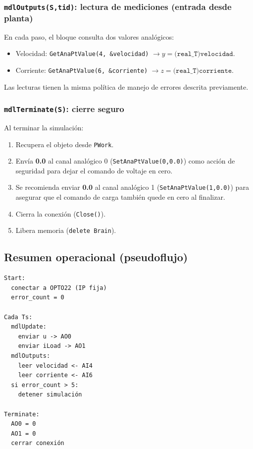 \subsubsection{\texttt{mdlOutputs(S,tid)}: lectura de mediciones (entrada desde planta)}
En cada paso, el bloque consulta dos valores analógicos:
\begin{itemize}
    \item Velocidad: \texttt{GetAnaPtValue(4, \&velocidad)} $\rightarrow y = \texttt{(real\_T)velocidad}$.
    \item Corriente: \texttt{GetAnaPtValue(6, \&corriente)} $\rightarrow z = \texttt{(real\_T)corriente}$.
\end{itemize}
Las lecturas tienen la misma política de manejo de errores descrita previamente.

\subsubsection{\texttt{mdlTerminate(S)}: cierre seguro}
Al terminar la simulación:
\begin{enumerate}
    \item Recupera el objeto desde \texttt{PWork}.
    \item Envía \textbf{0.0} al canal analógico 0 (\texttt{SetAnaPtValue(0,0.0)}) como acción de seguridad para dejar el comando de voltaje en cero.
    \item Se recomienda enviar \textbf{0.0} al canal analógico 1 (\texttt{SetAnaPtValue(1,0.0)}) para asegurar que el comando de carga también quede en cero al finalizar.
    \item Cierra la conexión (\texttt{Close()}).
    \item Libera memoria (\texttt{delete Brain}).
\end{enumerate}

\subsection{Resumen operacional (pseudoflujo)}
\begin{verbatim}
Start:
  conectar a OPTO22 (IP fija)
  error_count = 0

Cada Ts:
  mdlUpdate:
    enviar u -> AO0
    enviar iLoad -> AO1
  mdlOutputs:
    leer velocidad <- AI4
    leer corriente <- AI6
  si error_count > 5:
    detener simulación

Terminate:
  AO0 = 0
  AO1 = 0
  cerrar conexión
\end{verbatim}

